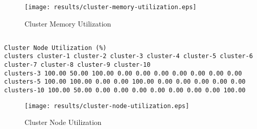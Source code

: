 \documentclass{elsart}
\begin{document}
\begin{figure}[ht]
\centering
\texttt{[image: results/cluster-memory-utilization.eps]}
\caption{Cluster Memory Utilization}\label{fig:cluster-memory-utilization.eps}
\end{figure}

\subsection{}

\begin{lstlisting}[caption={Cluster Node Utilization}]
Cluster Node Utilization (%)
clusters cluster-1 cluster-2 cluster-3 cluster-4 cluster-5 cluster-6 cluster-7 cluster-8 cluster-9 cluster-10
clusters-3 100.00 50.00 100.00 0.00 0.00 0.00 0.00 0.00 0.00 0.00
clusters-5 100.00 100.00 0.00 0.00 100.00 0.00 0.00 0.00 0.00 0.00
clusters-10 100.00 50.00 0.00 0.00 0.00 0.00 0.00 0.00 0.00 100.00
\end{lstlisting}

\begin{figure}[ht]
\centering
\texttt{[image: results/cluster-node-utilization.eps]}
\caption{Cluster Node Utilization}\label{fig:cluster-node-utilization.eps}
\end{figure}
\end{document}
